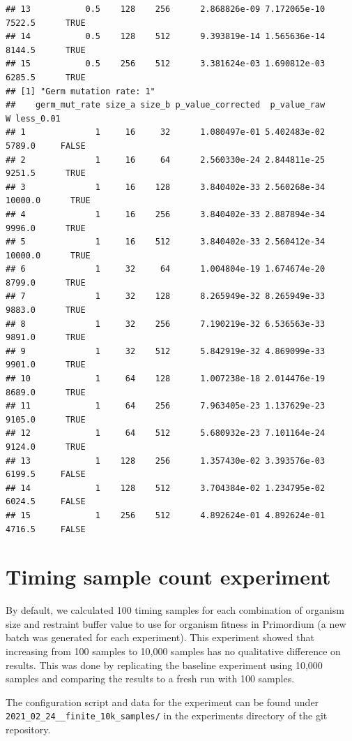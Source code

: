 \documentclass[
]{book}
\begin{document}
\begin{verbatim}
## 13           0.5    128    256      2.868826e-09 7.172065e-10  7522.5      TRUE
## 14           0.5    128    512      9.393819e-14 1.565636e-14  8144.5      TRUE
## 15           0.5    256    512      3.381624e-03 1.690812e-03  6285.5      TRUE
## [1] "Germ mutation rate: 1"
##    germ_mut_rate size_a size_b p_value_corrected  p_value_raw       W less_0.01
## 1              1     16     32      1.080497e-01 5.402483e-02  5789.0     FALSE
## 2              1     16     64      2.560330e-24 2.844811e-25  9251.5      TRUE
## 3              1     16    128      3.840402e-33 2.560268e-34 10000.0      TRUE
## 4              1     16    256      3.840402e-33 2.887894e-34  9996.0      TRUE
## 5              1     16    512      3.840402e-33 2.560412e-34 10000.0      TRUE
## 6              1     32     64      1.004804e-19 1.674674e-20  8799.0      TRUE
## 7              1     32    128      8.265949e-32 8.265949e-33  9883.0      TRUE
## 8              1     32    256      7.190219e-32 6.536563e-33  9891.0      TRUE
## 9              1     32    512      5.842919e-32 4.869099e-33  9901.0      TRUE
## 10             1     64    128      1.007238e-18 2.014476e-19  8689.0      TRUE
## 11             1     64    256      7.963405e-23 1.137629e-23  9105.0      TRUE
## 12             1     64    512      5.680932e-23 7.101164e-24  9124.0      TRUE
## 13             1    128    256      1.357430e-02 3.393576e-03  6199.5     FALSE
## 14             1    128    512      3.704384e-02 1.234795e-02  6024.5     FALSE
## 15             1    256    512      4.892624e-01 4.892624e-01  4716.5     FALSE
\end{verbatim}

\hypertarget{timing-sample-count-experiment}{%
\chapter{Timing sample count experiment}\label{timing-sample-count-experiment}}

By default, we calculated 100 timing samples for each combination of organism size and restraint buffer value to use for organism fitness in Primordium (a new batch was generated for each experiment).
This experiment showed that increasing from 100 samples to 10,000 samples has no qualitative difference on results.
This was done by replicating the baseline experiment using 10,000 samples and comparing the results to a fresh run with 100 samples.

The configuration script and data for the experiment can be found under \texttt{2021\_02\_24\_\_finite\_10k\_samples/} in the experiments directory of the git repository.
\end{document}

